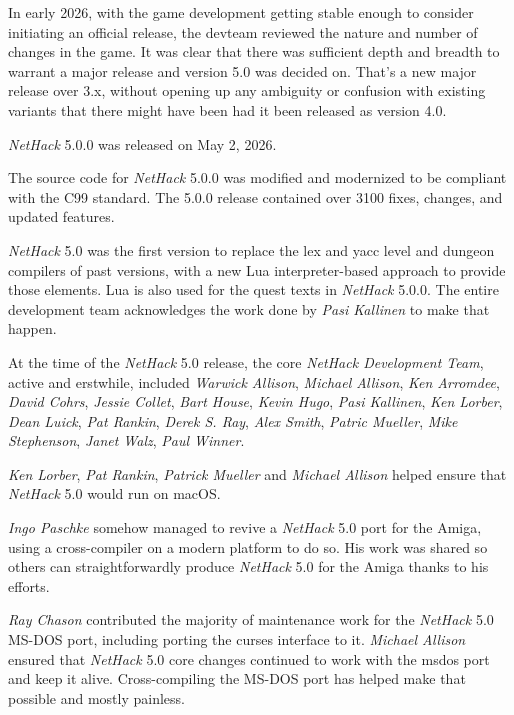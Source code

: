 \documentclass[titlepage]{article}
\begin{document}
\medskip
In early 2026, with the game development getting stable enough to consider
initiating an official release, the devteam reviewed the nature and number of
changes in the game. It was clear that there was sufficient depth and
breadth to warrant a major release and version 5.0 was decided on.
That's a new major release over 3.x, without opening up any ambiguity
or confusion with existing variants that there might have been had it
been released as version 4.0.

\medskip
\textit{NetHack} 5.0.0 was released on May 2, 2026.

\medskip
The source code for \textit{NetHack} 5.0.0 was modified and modernized to be
compliant with the C99 standard. The 5.0.0 release contained over 3100 fixes,
changes, and updated features.

\medskip
\textit{NetHack} 5.0 was the first version to replace the lex and yacc level
and dungeon compilers of past versions, with a new Lua interpreter-based
approach to provide those elements. Lua is also used for the quest texts
in \textit{NetHack} 5.0.0. The entire development team acknowledges the work
done by \textit{Pasi Kallinen} to make that happen.

\medskip
At the time of the \textit{NetHack} 5.0 release, the core
\textit{NetHack Development Team},
active and erstwhile, included \textit{Warwick Allison}, \textit{Michael Allison},
\textit{Ken Arromdee}, \textit{David Cohrs}, \textit{Jessie Collet}, \textit{Bart House},
\textit{Kevin Hugo}, \textit{Pasi Kallinen}, \textit{Ken Lorber}, \textit{Dean Luick},
\textit{Pat Rankin}, \textit{Derek S. Ray}, \textit{Alex Smith}, \textit{Patric Mueller},
\textit{Mike Stephenson}, \textit{Janet Walz}, \textit{Paul Winner}.

\medskip
\textit{Ken Lorber}, \textit{Pat Rankin}, \textit{Patrick Mueller} and
\textit{Michael Allison} helped ensure that \textit{NetHack} 5.0 would run
on macOS.

\medskip
\textit{Ingo Paschke} somehow managed to revive a \textit{NetHack} 5.0 port for the Amiga,
using a cross-compiler on a modern platform to do so. His work was shared so
others can straightforwardly produce \textit{NetHack} 5.0 for the Amiga thanks to his
efforts.

\medskip
\textit{Ray Chason} contributed the majority of maintenance work for the
\textit{NetHack} 5.0 MS-DOS port, including porting the curses interface to it.
\textit{Michael Allison} ensured that \textit{NetHack} 5.0 core changes continued to
work with the msdos port and keep it alive.  Cross-compiling the MS-DOS
port has helped make that possible and mostly painless.
\end{document}
